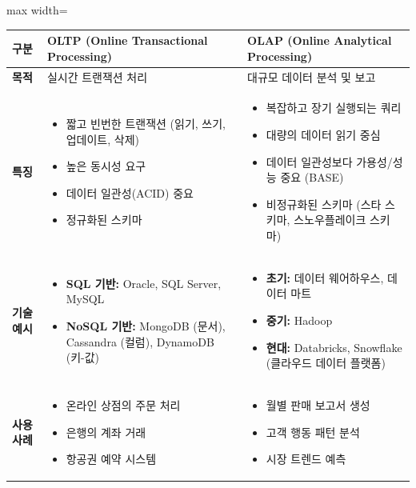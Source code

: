 \documentclass[11pt,a4paper]{article}
\theoremstyle{definition}
\begin{document}
\begin{adjustbox}{max width=\textwidth}
\begin{tabular}{lll}
\toprule
\textbf{구분} & \textbf{OLTP (Online Transactional Processing)} & \textbf{OLAP (Online Analytical Processing)} \\
\midrule
\textbf{목적} & 실시간 트랜잭션 처리 & 대규모 데이터 분석 및 보고 \\
\textbf{특징} &
\begin{itemize}
    \item 짧고 빈번한 트랜잭션 (읽기, 쓰기, 업데이트, 삭제)
    \item 높은 동시성 요구
    \item 데이터 일관성(ACID) 중요
    \item 정규화된 스키마
\end{itemize} &
\begin{itemize}
    \item 복잡하고 장기 실행되는 쿼리
    \item 대량의 데이터 읽기 중심
    \item 데이터 일관성보다 가용성/성능 중요 (BASE)
    \item 비정규화된 스키마 (스타 스키마, 스노우플레이크 스키마)
\end{itemize} \\
\textbf{기술 예시} &
\begin{itemize}
    \item \textbf{SQL 기반:} Oracle, SQL Server, MySQL
    \item \textbf{NoSQL 기반:} MongoDB (문서), Cassandra (컬럼), DynamoDB (키-값)
\end{itemize} &
\begin{itemize}
    \item \textbf{초기:} 데이터 웨어하우스, 데이터 마트
    \item \textbf{중기:} Hadoop
    \item \textbf{현대:} Databricks, Snowflake (클라우드 데이터 플랫폼)
\end{itemize} \\
\textbf{사용 사례} &
\begin{itemize}
    \item 온라인 상점의 주문 처리
    \item 은행의 계좌 거래
    \item 항공권 예약 시스템
\end{itemize} &
\begin{itemize}
    \item 월별 판매 보고서 생성
    \item 고객 행동 패턴 분석
    \item 시장 트렌드 예측
\end{itemize} \\
\bottomrule
\end{tabular}
\end{adjustbox}
\end{document}
